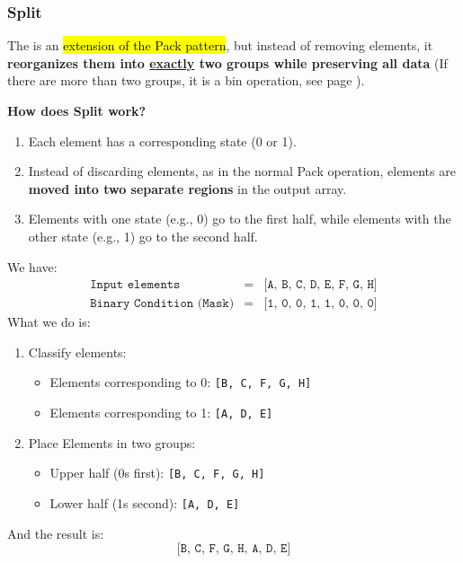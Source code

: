 \subsubsection{Split}

The  is an \hl{extension of the Pack pattern}, but instead of removing elements, it \textbf{reorganizes them into \underline{exactly} two groups while preserving all data} (If there are more than two groups, it is a bin operation, see page \pageref{subsubsection: Bin}).

\highspace
\begin{flushleft}
    \textcolor{Green3}{ \textbf{How does Split work?}}
\end{flushleft}
\begin{enumerate}
    \item Each element has a corresponding state (0 or 1).
    \item Instead of discarding elements, as in the normal Pack operation, elements are \textbf{moved into two separate regions} in the output array.
    \item Elements with one state (e.g., 0) go to the first half, while elements with the other state (e.g., 1) go to the second half.
\end{enumerate}

\highspace
\begin{examplebox}
    We have:
    \begin{equation*}
        \begin{array}{rcl}
            \texttt{Input elements} &=& \texttt{[A, B, C, D, E, F, G, H]} \\ [.5em]
            \texttt{Binary Condition (Mask)} &=& \texttt{[1, 0, 0, 1, 1, 0, 0, 0]}
        \end{array}
    \end{equation*}
    What we do is:
    \begin{enumerate}
        \item Classify elements:
        \begin{itemize}
            \item Elements corresponding to 0: \texttt{[B, C, F, G, H]}
            \item Elements corresponding to 1: \texttt{[A, D, E]}
        \end{itemize}
        \item Place Elements in two groups:
        \begin{itemize}
            \item Upper half (0s first): \texttt{[B, C, F, G, H]}
            \item Lower half (1s second): \texttt{[A, D, E]}
        \end{itemize}
    \end{enumerate}
    And the result is:
    \begin{equation*}
        \texttt{[B, C, F, G, H, A, D, E]}
    \end{equation*}
\end{examplebox}

